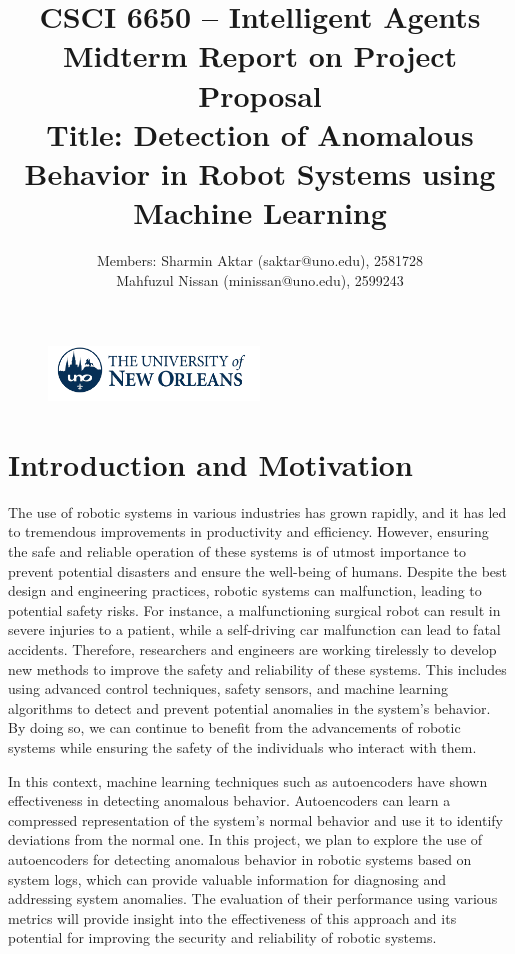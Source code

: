 \documentclass[12]{article}
\title{\textbf{CSCI 6650 – Intelligent Agents}\\\textbf{Midterm Report on Project Proposal}\\
\textbf{Title: Detection of Anomalous Behavior in Robot Systems using Machine Learning}}
\author{Members: Sharmin Aktar (saktar@uno.edu), 2581728\\
Mahfuzul Nissan (minissan@uno.edu), 2599243}
\date{}
\begin{document}
\begin{figure}
\centering
\includegraphics[width=0.5\textwidth]{images/uno_logo.png}
\end{figure}

\maketitle


\section{Introduction and Motivation}

The use of robotic systems in various industries has grown rapidly, and it has led to tremendous improvements in productivity and efficiency. However, ensuring the safe and reliable operation of these systems is of utmost importance to prevent potential disasters and ensure the well-being of humans. Despite the best design and engineering practices, robotic systems can malfunction, leading to potential safety risks. For instance, a malfunctioning surgical robot can result in severe injuries to a patient, while a self-driving car malfunction can lead to fatal accidents. Therefore, researchers and engineers are working tirelessly to develop new methods to improve the safety and reliability of these systems. This includes using advanced control techniques, safety sensors, and machine learning algorithms to detect and prevent potential anomalies in the system's behavior. By doing so, we can continue to benefit from the advancements of robotic systems while ensuring the safety of the individuals who interact with them.


In this context, machine learning techniques such as autoencoders have shown effectiveness in detecting anomalous behavior\cite{b3}. Autoencoders can learn a compressed representation of the system's normal behavior and use it to identify deviations from the normal one. In this project, we plan to explore the use of autoencoders for detecting anomalous behavior in robotic systems based on system logs, which can provide valuable information for diagnosing and addressing system anomalies. The evaluation of their performance using various metrics will provide insight into the effectiveness of this approach and its potential for improving the security and reliability of robotic systems.
\end{document}
